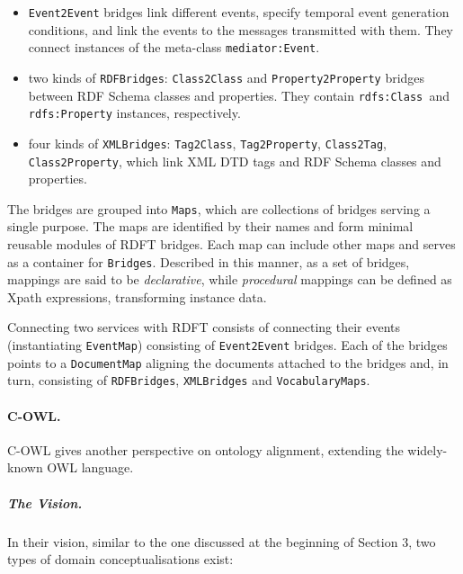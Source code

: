 \documentclass{fast_latex}
\begin{document}
\begin{itemize}
\item \texttt{Event2Event} bridges link different events,
specify temporal event generation conditions, and link the events to
the messages transmitted with them. They connect instances of the
meta-class \texttt{mediator:Event}. 
\item two kinds of \texttt{RDFBridges}:
\texttt{Class2Class} and
\texttt{Property2Property} bridges between RDF Schema
classes and properties. They contain \texttt{rdfs:Class
}and \texttt{rdfs:Property} instances, respectively. 
\item four kinds of \texttt{XMLBridges}:
\texttt{Tag2Class}, \texttt{Tag2Property},
\texttt{Class2Tag}, \texttt{Class2Property},
which link XML DTD tags and RDF Schema classes and properties. 
\end{itemize}
The bridges are grouped into \texttt{Maps}, which are
collections of bridges serving a single purpose. The maps are
identified by their names and form minimal reusable modules of RDFT
bridges. Each map can include other maps and serves as a container for
\texttt{Bridges}. Described in this manner, as a set of
bridges, mappings are said to be \textit{declarative}, while
\textit{procedural} mappings can be defined as Xpath \cite{clark1999xpath} expressions, transforming instance data. 

Connecting two services with RDFT consists of connecting their events
(instantiating \texttt{EventMap}) consisting of
\texttt{Event2Event} bridges. Each of the bridges points
to a \texttt{DocumentMap} aligning the documents attached
to the bridges and, in turn, consisting of
\texttt{RDFBridges}, \texttt{XMLBridges} and
\texttt{VocabularyMaps}. 

\paragraph{C-OWL.}
C-OWL \cite{bouquet2004cowl} gives another perspective on ontology
alignment, extending the widely-known OWL \cite{dean2004owl}
language. 

\subparagraph{The Vision.}
In their vision, similar to the one discussed at the beginning of
Section 3, two types of domain conceptualisations exist: 
\end{document}
